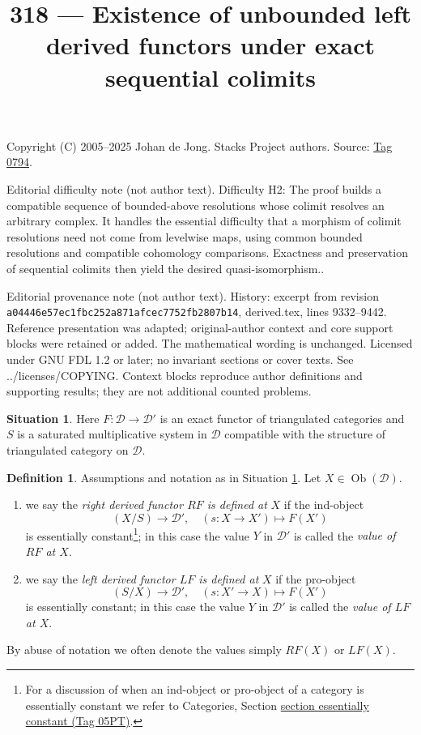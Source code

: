 \documentclass{amsart}
\theoremstyle{plain}
\theoremstyle{definition}
\newtheorem{definition}[subsection]{Definition}
\newtheorem{situation}[subsection]{Situation}
\theoremstyle{remark}
\numberwithin{equation}{subsection}
\def\Ob{\mathop{\mathrm{Ob}}\nolimits}
\begin{document}
\title[Stacks Project, Tag 0794]{318 --- Existence of unbounded left derived functors under exact sequential colimits}
\maketitle
\noindent Copyright (C) 2005--2025 Johan de Jong. Stacks Project authors. Source: \href{https://stacks.math.columbia.edu/tag/0794}{Tag 0794}.

\noindent Editorial difficulty note (not author text). Difficulty H2: The proof builds a compatible sequence of bounded-above resolutions whose colimit resolves an arbitrary complex. It handles the essential difficulty that a morphism of colimit resolutions need not come from levelwise maps, using common bounded resolutions and compatible cohomology comparisons. Exactness and preservation of sequential colimits then yield the desired quasi-isomorphism..

\noindent Editorial provenance note (not author text). History: excerpt from revision \texttt{a0444\allowbreak 6e57e\allowbreak c1fbc\allowbreak 252a8\allowbreak 71afc\allowbreak ec775\allowbreak 2fb28\allowbreak 07b14}, derived.tex, lines 9332--9442. Reference presentation was adapted; original-author context and core support blocks were retained or added. The mathematical wording is unchanged. Licensed under GNU FDL 1.2 or later; no invariant sections or cover texts. See ../licenses/COPYING. Context blocks reproduce author definitions and supporting results; they are not additional counted problems.

\begin{situation}
\label{situation-derived-functor}
Here $F : \mathcal{D} \to \mathcal{D}'$ is an exact functor of triangulated
categories and $S$ is a saturated multiplicative
system in $\mathcal{D}$ compatible with the structure
of triangulated category on $\mathcal{D}$.
\end{situation}

\begin{definition}
\label{definition-right-derived-functor-defined}
Assumptions and notation as in
Situation \ref{situation-derived-functor}.
Let $X \in \Ob(\mathcal{D})$.
\begin{enumerate}
\item we say the {\it right derived functor $RF$ is defined at}
$X$ if the ind-object
$$
(X/S) \longrightarrow \mathcal{D}', \quad
(s : X \to X') \longmapsto F(X')
$$
is essentially constant\footnote{For a discussion of when an ind-object
or pro-object of a category is essentially constant we refer to
Categories, Section \href{https://stacks.math.columbia.edu/tag/05PT}{section essentially constant (Tag 05PT)}.};
in this case the value
$Y$ in $\mathcal{D}'$ is called the {\it value of $RF$ at $X$}.
\item we say the {\it left derived functor $LF$ is defined at} $X$
if the pro-object
$$
(S/X) \longrightarrow \mathcal{D}', \quad
(s: X' \to X) \longmapsto F(X')
$$
is essentially constant; in this case the value $Y$ in $\mathcal{D}'$
is called the {\it value of $LF$ at $X$}.
\end{enumerate}
By abuse of notation we often denote the values simply
$RF(X)$ or $LF(X)$.
\end{definition}
\end{document}
